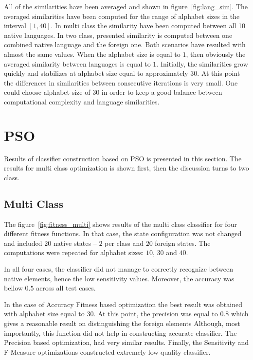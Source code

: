 \documentclass{mini}
\begin{document}
\makeTableMutualSimilarites

All of the similarities have been averaged and shown in figure~\ref{fig:lang_sim}. The averaged similarities have been computed for the range of alphabet sizes in the interval $[1, 40]$. In multi class the similarity have been computed between all 10 native languages. In two class, presented similarity is computed between one combined native language and the foreign one. Both scenarios have resulted with almost the same values. When the alphabet size is equal to $1$, then obviously the averaged similarity between languages is equal to $1$. Initially, the similarities grow quickly and stabilizes at alphabet size equal to approximately $30$. At this point the differences in similarities between consecutive iterations is very small. One could choose alphabet size of $30$ in order to keep a good balance between computational complexity and language similarities.

\makeFigureAvgSimlarity


\section{PSO}

Results of classifier construction based on PSO is presented in this section. The results for multi class optimization is shown first, then the discussion turns to two class.

\subsection{Multi Class}

The figure~\ref{fig:fitness_multi} shows results of the multi class classifier for four different fitness functions. In that case, the state configuration was not changed and included $20$ native states -- $2$ per class and $20$ foreign states. The computations were repeated for alphabet sizes: $10$, $30$ and $40$.

In all four cases, the classifier did not manage to correctly recognize between native elements, hence the low sensitivity values. Moreover, the accuracy was bellow $0.5$ across all test cases. 

In the case of Accuracy Fitness based optimization the best result was obtained with alphabet size equal to $30$. At this point, the precision was equal to $0.8$ which gives a reasonable result on distinguishing the foreign elements Although, most importantly, this function did not help in constructing accurate classifier. The Precision based optimization, had very similar results. Finally, the Sensitivity and F-Measure optimizations constructed extremely low quality classifier.
\end{document}
